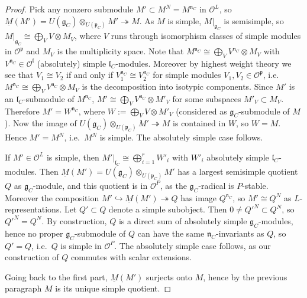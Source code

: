 \documentclass[a4paper]{amsart}
\numberwithin{equation}{section}
\theoremstyle{remark}
\theoremstyle{definition}
\renewcommand{\simeq}{\cong}
\begin{document}
\begin{proof}
Pick any nonzero submodule $M' \subset M^N = M^{\mathfrak{n}_{C}}$ in $\mathcal{O}^{L}$, so $\underline M(M') = U(\mathfrak{g}_{C}) \otimes_{U(\mathfrak{p}_{C})} M' \twoheadrightarrow M$.
As $M$ is simple, $M|_{\mathfrak{g}_{C}}$ is semisimple, so $M|_{\mathfrak{g}_{C}} \simeq\bigoplus_{V}V\otimes M_{V}$, where $V$ runs through isomorphism classes of simple modules in $\mathcal{O}^{\mathfrak{p}}$ and $M_{V}$ is the multiplicity space.
Note that $M^{\mathfrak{n}_{C}}\simeq \bigoplus_{V}V^{\mathfrak{n}_{C}}\otimes M_{V}$ with $V^{\mathfrak{n}_{C}}\in \mathcal{O}^{\mathfrak{l}}$ (absolutely) simple $\mathfrak{l}_{C}$-modules.
Moreover by highest weight theory we see that $V_{1} \cong V_{2}$ if and only if $V_{1}^{\mathfrak{n}_{C}} \cong V_{2}^{\mathfrak{n}_{C}}$ for simple modules $V_{1},V_{2}\in \mathcal{O}^{\mathfrak{p}}$, i.e.\ $M^{\mathfrak{n}_{C}}\simeq \bigoplus_{V}V^{\mathfrak{n}_{C}}\otimes M_{V}$ is the decomposition into isotypic components.
Since $M'$ is an $\mathfrak{l}_{C}$-submodule of $M^{\mathfrak{n}_{C}}$, $M'\simeq \bigoplus_{V}V^{\mathfrak{n}_{C}}\otimes M'_{V}$ for some subspaces $M'_{V}\subset M_{V}$.
Therefore $M' = W^{\mathfrak{n}_{C}}$, where $W := \bigoplus_{V}V\otimes M'_{V}$ (considered as $\mathfrak g_C$-submodule of $M$).
Now the image of $U(\mathfrak{g}_{C}) \otimes_{U(\mathfrak{p}_{C})} M'\twoheadrightarrow M$ is contained in $W$, so $W = M$.
  Hence $M' = M^N$, i.e.\ $M^N$ is simple. The absolutely simple case follows.

  If $M' \in \mathcal{O}^{L}$ is simple, then $M'|_{\mathfrak{l}_{C}} \cong \bigoplus_{i=1}^r W'_i$ with $W'_i$ absolutely simple $\mathfrak{l}_{C}$-modules.
  Then $\underline M(M') = U(\mathfrak{g}_{C}) \otimes_{U(\mathfrak{p}_{C})} M'$ has a largest semisimple quotient $Q$ as $\mathfrak{g}_{C}$-module, and this quotient is in $\mathcal{O}^{P}$,
  as the $\mathfrak{g}_{C}$-radical is $P$-stable.
  Moreover the composition $M' \hookrightarrow \underline M(M') \twoheadrightarrow Q$ has image $Q^{\mathfrak{n}_{C}}$, 
  so $M' \cong Q^N$ as $L$-representations. Let $Q' \subset Q$ denote a simple subobject. Then $0 \ne {Q'}^N \subset Q^N$,
  so ${Q'}^N = Q^N$. By construction, $Q$ is a direct sum of absolutely simple $\mathfrak{g}_{C}$-modules, hence
  no proper $\mathfrak{g}_{C}$-submodule of $Q$ can have the same $\mathfrak{n}_{C}$-invariants as $Q$, so $Q' = Q$, i.e.\ $Q$ is simple in $\mathcal{O}^{P}$.
  The absolutely simple case follows, as our construction of $Q$ commutes with scalar extensions.

  Going back to the first part, $\underline M(M')$ surjects onto $M$, hence by the previous paragraph $M$ is its unique simple quotient.
\end{proof}
\end{document}
